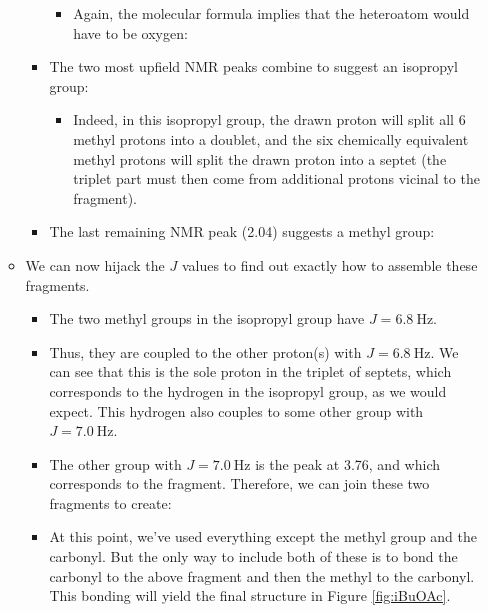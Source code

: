 \documentclass[../notes.tex]{subfiles}
\begin{document}
\begin{itemize}
\begin{itemize}
\begin{itemize}
\begin{itemize}
                \item Again, the molecular formula implies that the heteroatom would have to be oxygen: {\tiny{}}
            \end{itemize}
            \item The two most upfield  NMR peaks combine to suggest an isopropyl group: {\tiny{}}
            \begin{itemize}
                \item Indeed, in this isopropyl group, the drawn proton will split all 6 methyl protons into a doublet, and the six chemically equivalent methyl protons will split the drawn proton into a septet (the triplet part must then come from additional protons vicinal to the fragment).
            \end{itemize}
            \item The last remaining  NMR peak (\SI{2.04}{\partspermillion}) suggests a methyl group: {\tiny{}}
        \end{itemize}
        \item We can now hijack the $J$ values to find out exactly how to assemble these fragments.
        \begin{itemize}
            \item The two methyl groups in the isopropyl group have $J=\SI{6.8}{\hertz}$.
            \item Thus, they are coupled to the other proton(s) with $J=\SI{6.8}{\hertz}$. We can see that this is the sole proton in the triplet of septets, which corresponds to the hydrogen in the isopropyl group, as we would expect. This hydrogen also couples to some other group with $J=\SI{7.0}{\hertz}$.
            \item The other group with $J=\SI{7.0}{\hertz}$ is the peak at \SI{3.76}{\partspermillion}, and which corresponds to the {\tiny{}} fragment. Therefore, we can join these two fragments to create: {\tiny{}}
            \item At this point, we've used everything except the methyl group and the carbonyl. But the only way to include both of these is to bond the carbonyl to the above fragment and then the methyl to the carbonyl. This bonding will yield the final structure in Figure \ref{fig:iBuOAc}.

\end{itemize}
\end{itemize}
\end{itemize}
\end{document}
